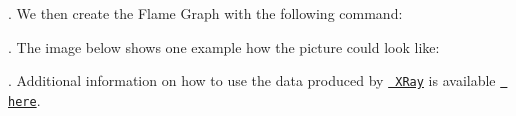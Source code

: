 \begin{DoxyCode}{0}
\end{DoxyCode}


. We then create the Flame Graph with the following command\+:


\begin{DoxyCode}{0}
\end{DoxyCode}


. The image below shows one example how the picture could look like\+:



. Additional information on how to use the data produced by \href{https://llvm.org/docs/XRay.html}{\texttt{ X\+Ray}} is available \href{https://llvm.org/docs/XRayExample.html}{\texttt{ here}}. 